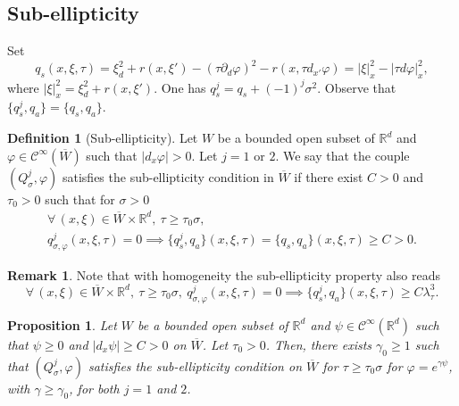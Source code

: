 \documentclass[10pt]{amsart}
\theoremstyle{plain}
\newtheorem{proposition}[theorem]{Proposition}
\theoremstyle{definition}
\newtheorem{definition}[theorem]{Definition}
\newtheorem{remark}[theorem]{Remark}
\def\R{\mathbb{R}}
\let\csp\gamma
\newcommand{\ovl}[1]{\overline{#1}}
\newcommand{\lsc}{\lambda_\tau}
\newcommand{\Qsig}{Q_{\sigma}}
\newcommand{\qconj}{q_{\sigma,\varphi}}
\newcommand{\qs}{q_{s}}
\newcommand{\qa}{q_{a}}
\newcommand{\Con}{\ensuremath{\mathscr C}}
\newcommand{\Cinf}{\ensuremath{\Con^\infty}}
\begin{document}
\subsection{Sub-ellipticity}
Set
\begin{equation*}
\qs(x,\xi,\tau)
=\xi_d^2+r(x,\xi')-(\tau\partial_d\varphi)^2
-r(x,\tau d_{x'}\varphi)
=|\xi|^2_x-|\tau d\varphi|_x^2,
\end{equation*}
where $|\xi|^2_x=\xi_d^2+r(x,\xi')$. One has $\qs^j= \qs + (-1)^j
\sigma^2$.
Observe that $\{\qs^j,\qa\}=\{\qs, \qa\}$.

\begin{definition}[Sub-ellipticity]\label{de1}
Let $W$ be a bounded open subset of $\R^d$ and
$\varphi\in \Cinf(\ovl{W})$ such that
$|d_x\varphi|>0$. Let $j =1$ or $2$. We say that the couple
$(\Qsig^j,\varphi)$ satisfies the sub-ellipticity condition
in $\ovl{W}$ if there exist $C>0$ and $\tau_0>0$ such that for
$\sigma>0$
\begin{multline*}
\forall\,(x,\xi)\in\ovl{W}\times\R^d,~\tau\geq
\tau_0\sigma,\\
\qconj^j(x,\xi,\tau)=0\implies
\{\qs^j,\qa\}(x,\xi,\tau) = \{\qs,\qa\}(x,\xi,\tau)\geq C>0.
\end{multline*}
\end{definition}

\begin{remark}
Note that with homogeneity the sub-ellipticity property also reads
\begin{equation*}
\forall\,(x,\xi)\in\ovl{W}\times\R^d,~\tau\geq
\tau_0\sigma,~\qconj^j(x,\xi,\tau)=0\implies
\{\qs^j,\qa\}(x,\xi,\tau)\geq C \lsc^3.
\end{equation*}
\end{remark}

\begin{proposition}
\label{prop: sub-ellipticity recipe}
Let $W$ be a bounded open subset of $\R^d$ and
$\psi\in\Cinf(\R^d)$ such that $\psi\geq 0$ and
$|d_x\psi|\geq C>0$ on $\ovl{W}$. Let $\tau_0>0$. Then, there exists
$\csp_0\geq 1$ such that $(\Qsig^j,\varphi)$
satisfies the sub-ellipticity condition
on $\ovl{W}$ for $\tau\geq\tau_0 \sigma$ for
$\varphi=e^{\csp\psi}$, with $\csp\geq \csp_0$, for both
$j=1$ and $2$.
\end{proposition}
\end{document}
